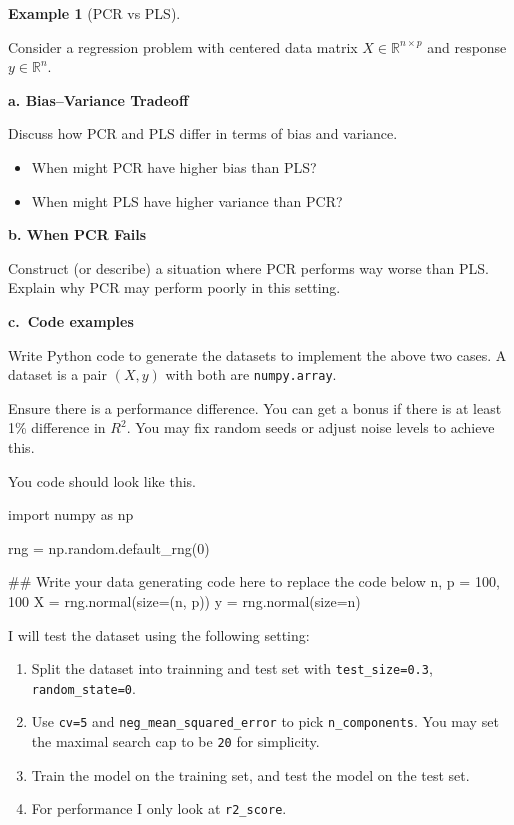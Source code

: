 \documentclass[
  english,
]{article}
\newenvironment{Shaded}{\begin{snugshade}}{\end{snugshade}}
\newcommand{\CommentTok}[1]{\textcolor[rgb]{0.37,0.37,0.37}{#1}}
\newcommand{\DecValTok}[1]{\textcolor[rgb]{0.68,0.00,0.00}{#1}}
\newcommand{\ImportTok}[1]{\textcolor[rgb]{0.00,0.46,0.62}{#1}}
\newcommand{\NormalTok}[1]{\textcolor[rgb]{0.00,0.23,0.31}{#1}}
\newcommand{\OperatorTok}[1]{\textcolor[rgb]{0.37,0.37,0.37}{#1}}
\providecommand{\tightlist}{%
  \setlength{\itemsep}{0pt}\setlength{\parskip}{0pt}}
\theoremstyle{definition}
\newtheorem{example}{Example}[section]
\theoremstyle{definition}
\theoremstyle{remark}
\begin{document}
\begin{example}[PCR vs PLS]\protect\hypertarget{exm-}{}\label{exm-}

Consider a regression problem with centered data matrix
\(X \in \mathbb{R}^{n \times p}\) and response \(y \in \mathbb{R}^n\).

\textbf{a. Bias--Variance Tradeoff}

Discuss how PCR and PLS differ in terms of bias and variance.

\begin{itemize}
\tightlist
\item
  When might PCR have higher bias than PLS?
\item
  When might PLS have higher variance than PCR?
\end{itemize}

\textbf{b. When PCR Fails}

Construct (or describe) a situation where PCR performs way worse than
PLS. Explain why PCR may perform poorly in this setting.

\textbf{c.~Code examples}

Write Python code to generate the datasets to implement the above two
cases. A dataset is a pair \((X,y)\) with both are \texttt{numpy.array}.

Ensure there is a performance difference. You can get a bonus if there
is at least 1\% difference in \(R^2\). You may fix random seeds or
adjust noise levels to achieve this.

You code should look like this.

\begin{Shaded}
\begin{Highlighting}[]
\ImportTok{import}\NormalTok{ numpy }\ImportTok{as}\NormalTok{ np}

\NormalTok{rng }\OperatorTok{=}\NormalTok{ np.random.default\_rng(}\DecValTok{0}\NormalTok{)}

\CommentTok{\#\# Write your data generating code here to replace the code below}
\NormalTok{n, p }\OperatorTok{=} \DecValTok{100}\NormalTok{, }\DecValTok{100}
\NormalTok{X }\OperatorTok{=}\NormalTok{ rng.normal(size}\OperatorTok{=}\NormalTok{(n, p))}
\NormalTok{y }\OperatorTok{=}\NormalTok{ rng.normal(size}\OperatorTok{=}\NormalTok{n)}
\end{Highlighting}
\end{Shaded}

I will test the dataset using the following setting:

\begin{enumerate}
\def\labelenumi{\arabic{enumi}.}
\tightlist
\item
  Split the dataset into trainning and test set with
  \texttt{test\_size=0.3}, \texttt{random\_state=0}.
\item
  Use \texttt{cv=5} and \texttt{neg\_mean\_squared\_error} to pick
  \texttt{n\_components}. You may set the maximal search cap to be
  \texttt{20} for simplicity.
\item
  Train the model on the training set, and test the model on the test
  set.
\item
  For performance I only look at \texttt{r2\_score}.
\end{enumerate}


\end{example}
\end{document}
